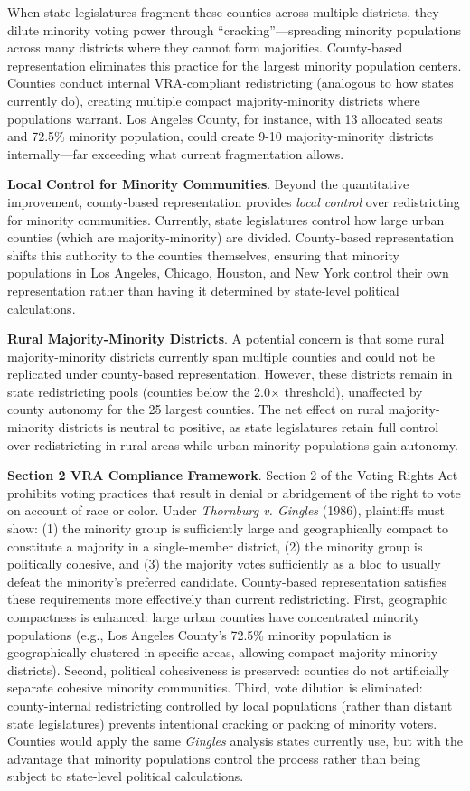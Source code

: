 When state legislatures fragment these counties across multiple districts, they dilute minority voting power through ``cracking''---spreading minority populations across many districts where they cannot form majorities. County-based representation eliminates this practice for the largest minority population centers. Counties conduct internal VRA-compliant redistricting (analogous to how states currently do), creating multiple compact majority-minority districts where populations warrant. Los Angeles County, for instance, with 13 allocated seats and 72.5\% minority population, could create 9-10 majority-minority districts internally---far exceeding what current fragmentation allows.

\textbf{Local Control for Minority Communities}. Beyond the quantitative improvement, county-based representation provides \emph{local control} over redistricting for minority communities. Currently, state legislatures control how large urban counties (which are majority-minority) are divided. County-based representation shifts this authority to the counties themselves, ensuring that minority populations in Los Angeles, Chicago, Houston, and New York control their own representation rather than having it determined by state-level political calculations.

\textbf{Rural Majority-Minority Districts}. A potential concern is that some rural majority-minority districts currently span multiple counties and could not be replicated under county-based representation. However, these districts remain in state redistricting pools (counties below the 2.0$\times$ threshold), unaffected by county autonomy for the 25 largest counties. The net effect on rural majority-minority districts is neutral to positive, as state legislatures retain full control over redistricting in rural areas while urban minority populations gain autonomy.

\textbf{Section 2 VRA Compliance Framework}. Section 2 of the Voting Rights Act prohibits voting practices that result in denial or abridgement of the right to vote on account of race or color. Under \emph{Thornburg v. Gingles} (1986), plaintiffs must show: (1) the minority group is sufficiently large and geographically compact to constitute a majority in a single-member district, (2) the minority group is politically cohesive, and (3) the majority votes sufficiently as a bloc to usually defeat the minority's preferred candidate. County-based representation satisfies these requirements more effectively than current redistricting. First, geographic compactness is enhanced: large urban counties have concentrated minority populations (e.g., Los Angeles County's 72.5\% minority population is geographically clustered in specific areas, allowing compact majority-minority districts). Second, political cohesiveness is preserved: counties do not artificially separate cohesive minority communities. Third, vote dilution is eliminated: county-internal redistricting controlled by local populations (rather than distant state legislatures) prevents intentional cracking or packing of minority voters. Counties would apply the same \emph{Gingles} analysis states currently use, but with the advantage that minority populations control the process rather than being subject to state-level political calculations.


